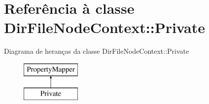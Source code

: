 \hypertarget{class_dir_file_node_context_1_1_private}{\section{Referência à classe Dir\-File\-Node\-Context\-:\-:Private}
\label{class_dir_file_node_context_1_1_private}
}
Diagrama de heranças da classe Dir\-File\-Node\-Context\-:\-:Private\begin{figure}[H]
\begin{center}
\leavevmode
\includegraphics[height=2.000000cm]{class_dir_file_node_context_1_1_private}
\end{center}
\end{figure}
